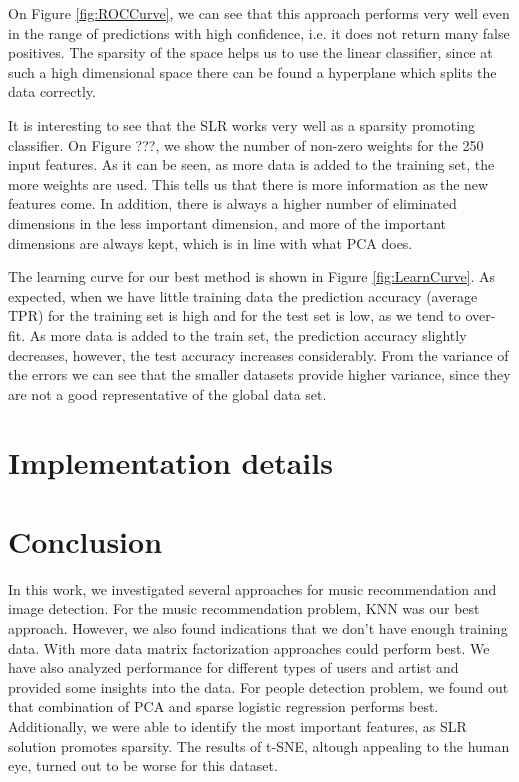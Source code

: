 \documentclass{article} %
\begin{document}
On Figure \ref{fig:ROCCurve}, we can see that this approach performs very well
even in the range of predictions with high confidence, i.e. it does not return many false positives. The 
sparsity of the space helps us to use the linear classifier, since at such a high 
dimensional space there can be found a hyperplane which splits the data
correctly.

It is interesting to see that the SLR works very well as a sparsity promoting classifier. 
On Figure ???, we show the number of non-zero weights for the 250 input features. 
As it can be seen, as more data is added to the training set, the more weights are used. 
This tells us that there is more information as the new features come. 
In addition, there is always a higher number of eliminated dimensions in the less 
important dimension, and more of the important dimensions are always kept, 
which is in line with what PCA does.

The learning curve for our best method is shown in Figure \ref{fig:LearnCurve}. As
expected, when we have little training data the prediction accuracy (average TPR) for the training set is high and 
for the test set is low, as we tend to over-fit. As more data is added to the train set, 
the prediction accuracy slightly decreases, however, the test accuracy increases considerably. 
From the variance of the errors we can see that the smaller datasets provide higher variance, 
since they are not a good representative of the global data set.


\section{Implementation details}


\section{Conclusion}
In this work, we investigated several approaches for music recommendation and
image detection. For the music recommendation problem, KNN was our best
approach. However, we also found indications that we don't have enough training
data. With more data matrix factorization approaches could perform best. We have
also analyzed performance for different types of users and artist and provided
some insights into the data. For people detection problem, we found out that
combination of PCA and sparse logistic regression performs best. Additionally,
we were able to identify the most important features, as SLR solution promotes
sparsity. The results of t-SNE, altough appealing to the human eye, turned out
to be worse for this dataset.
	



\end{document}
